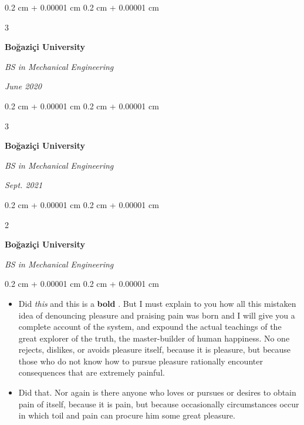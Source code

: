 \documentclass[10pt, letterpaper]{article}
\newenvironment{highlights}{
    \begin{itemize}[
        topsep=0.10 cm,
        parsep=0.10 cm,
        partopsep=0pt,
        itemsep=0pt,
        leftmargin=0.4 cm + 10pt + 0.6 cm
    ]
}{
    \end{itemize}
} %
\newenvironment{onecolentry}{
    \begin{adjustwidth}{
        0.2 cm + 0.00001 cm
    }{
        0.2 cm + 0.00001 cm
    }
}{
    \end{adjustwidth}
} %
\newenvironment{onecolentrybulleted}{
    \onecolentry
    \setcolumnwidth{0.6 cm, \fill}
    \begin{paracol}{2}
    \vspace*{\fill}
    \textbullet
    \vspace*{3px}
    \vspace*{\fill}
    \switchcolumn
}{
    \end{paracol}
    \endonecolentry
} %
\newenvironment{threecolentry}[3][]{
    \onecolentry
    \def\thirdColumn{#3}
    \setcolumnwidth{0.6 cm, \fill, 4.5 cm}
    \begin{paracol}{3}
    #2 \switchcolumn
}{
    \switchcolumn \raggedleft \thirdColumn
    \end{paracol}
    \endonecolentry
} %
\let\hrefWithoutArrow\href
\renewcommand{\href}[2]{\hrefWithoutArrow{#1}{\mbox{\ifthenelse{\equal{#2}{}}{ }{#2 }\raisebox{.15ex}{\footnotesize \faExternalLink*}}}}
\begin{document}
        \vspace{0.2 cm-3px}

        \begin{threecolentry}{
            \vspace*{\fill}
            \textbullet
            \vspace*{3px}
            \vspace*{\fill}
        }{
            
            
        \textit{June 2020}}
            \textbf{Boğaziçi University}

            \textit{BS in Mechanical Engineering}
        \end{threecolentry}



        \vspace{0.2 cm-3px}

        \begin{threecolentry}{
            \vspace*{\fill}
            \textbullet
            \vspace*{3px}
            \vspace*{\fill}
        }{
            
            
        \textit{Sept. 2021}}
            \textbf{Boğaziçi University}

            \textit{BS in Mechanical Engineering}
        \end{threecolentry}



        \vspace{0.2 cm-3px}

        \begin{onecolentrybulleted}
            \textbf{Boğaziçi University}

            \textit{BS in Mechanical Engineering}
        \end{onecolentrybulleted}

        \vspace{0.10 cm-3px}
        \begin{onecolentry}
            \begin{highlights}
                \item Did \textit{this} and this is a \textbf{bold} \href{https://example.com}{link}. But I must explain to you how all this mistaken idea of denouncing pleasure and praising pain was born and I will give you a complete account of the system, and expound the actual teachings of the great explorer of the truth, the master-builder of human happiness. No one rejects, dislikes, or avoids pleasure itself, because it is pleasure, but because those who do not know how to pursue pleasure rationally encounter consequences that are extremely painful.
                \item Did that. Nor again is there anyone who loves or pursues or desires to obtain pain of itself, because it is pain, but because occasionally circumstances occur in which toil and pain can procure him some great pleasure.
            \end{highlights}
        \end{onecolentry}
\end{document}
